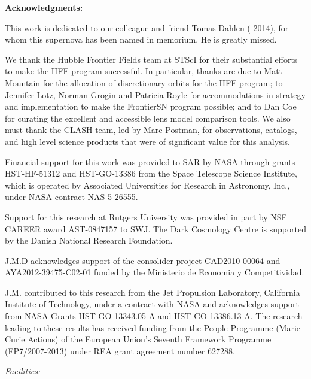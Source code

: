 \bigskip


{\bf Acknowledgments:}

This work is dedicated to our colleague and friend Tomas Dahlen
(-2014), for whom this supernova has been named in memorium. He is
greatly missed.

We thank the Hubble Frontier Fields team at STScI
for their substantial efforts to make the HFF program successful.  In
particular, thanks are due to Matt Mountain for the allocation of
discretionary orbits for the HFF program; to Jennifer Lotz, Norman
Grogin and Patricia Royle for accommodations in strategy and
implementation to make the FrontierSN program possible; and to Dan Coe
for curating the excellent and accessible lens model comparison tools.
We also must thank the CLASH team, led by Marc Postman, for
observations, catalogs, and high level science products that were of
significant value for this analysis.


Financial support for this work was provided to SAR by NASA through grants
HST-HF-51312 and HST-GO-13386 from the Space Telescope
Science Institute, which is operated by Associated Universities for
Research in Astronomy, Inc., under NASA contract NAS 5-26555.

Support for this research at Rutgers University was provided in part
by NSF CAREER award AST-0847157 to SWJ.  The Dark Cosmology Centre is
supported by the Danish National Research Foundation.

J.M.D acknowledges support of the consolider project CAD2010-00064 and
AYA2012-39475-C02-01 funded by the Ministerio de Economia y
Competitividad.

J.M. contributed to this research from the Jet Propulsion Laboratory,
California Institute of Technology, under a contract with NASA and
acknowledges support from NASA Grants HST-GO-13343.05-A and
HST-GO-13386.13-A. The research leading to these results has received
funding from the People Programme (Marie Curie Actions) of the European
Union's Seventh Framework Programme (FP7/2007-­2013) under REA grant
agreement number 627288.

{\it Facilities:} 
\smallskip






